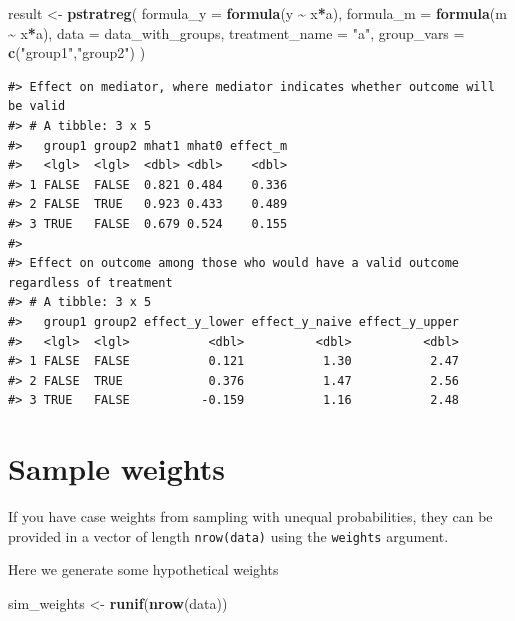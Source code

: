\documentclass[
]{book}
\newenvironment{Shaded}{\begin{snugshade}}{\end{snugshade}}
\newcommand{\AttributeTok}[1]{\textcolor[rgb]{0.13,0.29,0.53}{#1}}
\newcommand{\FunctionTok}[1]{\textcolor[rgb]{0.13,0.29,0.53}{\textbf{#1}}}
\newcommand{\NormalTok}[1]{#1}
\newcommand{\OtherTok}[1]{\textcolor[rgb]{0.56,0.35,0.01}{#1}}
\newcommand{\SpecialCharTok}[1]{\textcolor[rgb]{0.81,0.36,0.00}{\textbf{#1}}}
\newcommand{\StringTok}[1]{\textcolor[rgb]{0.31,0.60,0.02}{#1}}
\begin{document}
\begin{Shaded}
\begin{Highlighting}[]
\NormalTok{result }\OtherTok{\textless{}{-}} \FunctionTok{pstratreg}\NormalTok{(}
  \AttributeTok{formula\_y =} \FunctionTok{formula}\NormalTok{(y }\SpecialCharTok{\textasciitilde{}}\NormalTok{ x}\SpecialCharTok{*}\NormalTok{a),}
  \AttributeTok{formula\_m =} \FunctionTok{formula}\NormalTok{(m }\SpecialCharTok{\textasciitilde{}}\NormalTok{ x}\SpecialCharTok{*}\NormalTok{a),}
  \AttributeTok{data =}\NormalTok{ data\_with\_groups,}
  \AttributeTok{treatment\_name =} \StringTok{"a"}\NormalTok{,}
  \AttributeTok{group\_vars =} \FunctionTok{c}\NormalTok{(}\StringTok{"group1"}\NormalTok{,}\StringTok{"group2"}\NormalTok{)}
\NormalTok{)}
\end{Highlighting}
\end{Shaded}

\begin{verbatim}
#> Effect on mediator, where mediator indicates whether outcome will be valid
#> # A tibble: 3 x 5
#>   group1 group2 mhat1 mhat0 effect_m
#>   <lgl>  <lgl>  <dbl> <dbl>    <dbl>
#> 1 FALSE  FALSE  0.821 0.484    0.336
#> 2 FALSE  TRUE   0.923 0.433    0.489
#> 3 TRUE   FALSE  0.679 0.524    0.155
#> 
#> Effect on outcome among those who would have a valid outcome regardless of treatment
#> # A tibble: 3 x 5
#>   group1 group2 effect_y_lower effect_y_naive effect_y_upper
#>   <lgl>  <lgl>           <dbl>          <dbl>          <dbl>
#> 1 FALSE  FALSE           0.121           1.30           2.47
#> 2 FALSE  TRUE            0.376           1.47           2.56
#> 3 TRUE   FALSE          -0.159           1.16           2.48
\end{verbatim}

\hypertarget{sample-weights}{%
\section{Sample weights}\label{sample-weights}}

If you have case weights from sampling with unequal probabilities, they can be provided in a vector of length \texttt{nrow(data)} using the \texttt{weights} argument.

Here we generate some hypothetical weights

\begin{Shaded}
\begin{Highlighting}[]
\NormalTok{sim\_weights }\OtherTok{\textless{}{-}} \FunctionTok{runif}\NormalTok{(}\FunctionTok{nrow}\NormalTok{(data))}
\end{Highlighting}
\end{Shaded}
\end{document}
